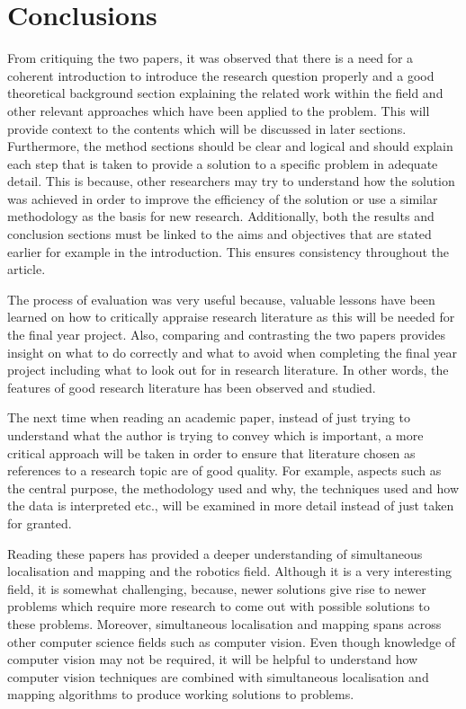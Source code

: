 \documentclass[a4paper, 12pt]{article}
\begin{document}
\section{Conclusions}
From critiquing the two papers, it was observed that there is a need for a coherent introduction to introduce the research question properly and a good theoretical background section explaining the related work within the field and other relevant approaches which have been applied to the problem. This will provide context to the contents which will be discussed in later sections. Furthermore, the method sections should be clear and logical and should explain each step that is taken to provide a solution to a specific problem in adequate detail. This is because, other researchers may try to understand how the solution was achieved in order to improve the efficiency of the solution or use a similar methodology as the basis for new research. Additionally, both the results and conclusion sections must be linked to the aims and objectives that are stated earlier for example in the introduction. This ensures consistency throughout the article.

The process of evaluation was very useful because, valuable lessons have been learned on how to critically appraise research literature as this will be needed for the final year project. Also, comparing and contrasting the two papers provides insight on what to do correctly and what to avoid when completing the final year project including what to look out for in research literature. In other words, the features of good research literature has been observed and studied.

The next time when reading an academic paper, instead of just trying to understand what the author is trying to convey which is important, a more critical approach will be taken in order to ensure that literature chosen as references to a research topic are of good quality. For example, aspects such as the central purpose, the methodology used and why, the techniques used and how the data is interpreted etc., will be examined in more detail instead of just taken for granted. 

Reading these papers has provided a deeper understanding of simultaneous localisation and mapping and the robotics field. Although it is a very interesting field, it is somewhat challenging, because, newer solutions give rise to newer problems which require more research to come out with possible solutions to these problems. Moreover, simultaneous localisation and mapping spans across other computer science fields such as computer vision. Even though knowledge of computer vision may not be required, it will be helpful to understand how computer vision techniques are combined with simultaneous localisation and mapping algorithms to produce working solutions to problems.
\end{document}
